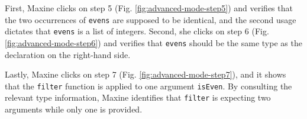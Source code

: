 First, Maxine clicks on step 5 (Fig. \ref{fig:advanced-mode-step5}) and verifies
that the two occurrences of \texttt{evens} are supposed to be identical, and the
second usage dictates that \texttt{evens} is a list of integers. Second, she
clicks on step 6 (Fig. \ref{fig:advanced-mode-step6}) and verifies that
\texttt{evens} should be the same type as the declaration on the right-hand
side. 


Lastly, Maxine clicks on step 7 (Fig. \ref{fig:advanced-mode-step7}), and
it shows that the \texttt{filter} function is applied to one argument
\texttt{isEven}. By consulting the relevant type information, Maxine identifies
that \texttt{filter} is expecting two arguments while only one is provided. 

